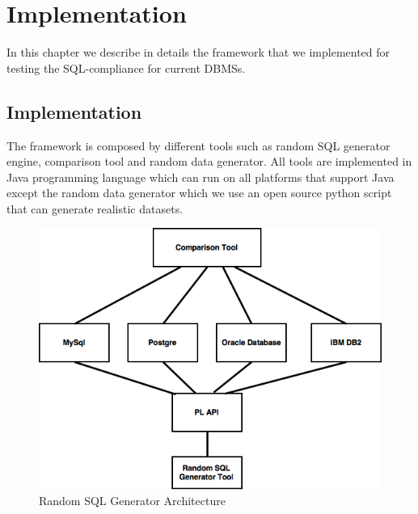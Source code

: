 \chapter{Implementation}
In this chapter we describe in details the framework that we implemented for testing the SQL-compliance for current DBMSs.


\section{Implementation}
The framework is composed by different tools such as random SQL generator engine, comparison tool and random data generator.  All tools are implemented in Java programming language which can run on all platforms that support Java except the random data generator which we use an open source python script that can generate realistic datasets.

 \begin{figure} 
      \centering
      \includegraphics[width=\textwidth]{Images/Chapter4/1-implemen_detail}
      \caption{Random SQL Generator Architecture}
      \label{fig:counting-methods}
    \end{figure}


